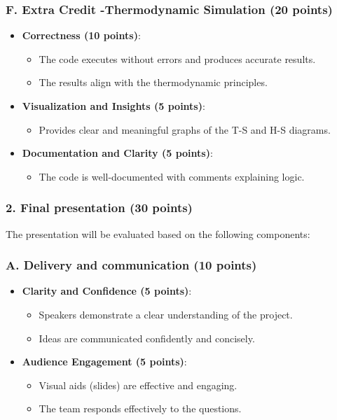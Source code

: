 \documentclass[11pt]{article}
\begin{document}
\subsubsection*{F. Extra Credit -Thermodynamic Simulation (20 points)}
\begin{itemize}
    \item \textbf{Correctness (10 points)}:
    \begin{itemize}
        \item The code executes without errors and produces accurate results.
        \item The results align with the thermodynamic principles.
    \end{itemize}
    \item \textbf{Visualization and Insights (5 points)}:
    \begin{itemize}
        \item Provides clear and meaningful graphs of the T-S and H-S diagrams.
    \end{itemize}
    \item \textbf{Documentation and Clarity (5 points)}:
    \begin{itemize}
        \item The code is well-documented with comments explaining logic.
    \end{itemize}
\end{itemize}

\subsubsection*{2. Final presentation (30 points)}
The presentation will be evaluated based on the following components:

\subsubsection*{A. Delivery and communication (10 points)}
\begin{itemize}
    \item \textbf{Clarity and Confidence (5 points)}:
    \begin{itemize}
        \item Speakers demonstrate a clear understanding of the project.
        \item Ideas are communicated confidently and concisely.
    \end{itemize}
    \item \textbf{Audience Engagement (5 points)}:
    \begin{itemize}
        \item Visual aids (slides) are effective and engaging.
        \item The team responds effectively to the questions.
    \end{itemize}
\end{itemize}
\end{document}
